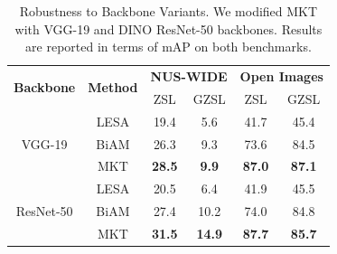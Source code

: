 \begin{table}[t]
\centering
\footnotesize
\caption{Robustness to Backbone Variants. We modified MKT with VGG-19 and DINO ResNet-50 backbones. Results are reported in terms of mAP on both benchmarks. 
}
\begin{tabular}{cccc|cc} 
\toprule[0.15em]
\multirow{2}{*}{\textbf{Backbone}} & \multirow{2}{*}{\textbf{Method}} &
\multicolumn{2}{c}{\textbf{NUS-WIDE}} &  \multicolumn{2}{c}{\textbf{Open Images}} \\
& & ZSL & GZSL & ZSL & GZSL \\
\toprule[0.15em]
\multirow{3}{*}{VGG-19} 
& LESA & 19.4 & 5.6 & 41.7 & 45.4\\
& BiAM & 26.3 & 9.3 & 73.6 & 84.5\\
& MKT & \textbf{28.5} & \textbf{9.9}  
& \textbf{87.0} 
& \textbf{87.1}\\
\hline
\multirow{3}{*}{ResNet-50} 
& LESA & 20.5 & 6.4 & 41.9 & 45.5 \\
& BiAM & 27.4 & 10.2 & 74.0 & 84.8\\
& MKT & \textbf{31.5} & \textbf{14.9}
& \textbf{87.7}
& \textbf{85.7}\\
\bottomrule[0.1em]
\end{tabular}
\label{tab:switch_backbone}
\end{table}
